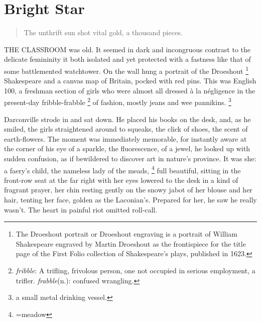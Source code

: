 \chapter{Bright Star}
 
\begin{quotation}
  The unthrift 
sun shot vital gold, a thousand pieces.
\end{quotation}
\vspace{0.2cm}
 
  THE CLASSROOM was old. It seemed in dark and incongruous 
contrast to the
delicate femininity it both isolated and yet protected with a fastness like that
of some battlemented watchtower. On the wall hung a portrait of the Droeshout
\footnote{ The Droeshout portrait or Droeshout engraving is a portrait of
William Shakespeare engraved by Martin Droeshout as the frontispiece for the
title page of the First Folio collection of Shakespeare's plays, published in
1623.
}
Shakespeare and a canvas map of Britain, pocked 
with red pins. This was English
100, a freshman section of girls who were almost all dressed à la négligence in
the present-day fribble-frabble 
\footnote{ \textit{fribble}: A trifling, frivolous person, one not occupied in
serious employment, a trifler. \textit{frabble}(n.): confused wrangling.
}
of fashion, mostly jeans and wee 
pannikins.
\footnote{ \textdbend a small metal drinking vessel.}

  Darconville strode 
in and sat down. He placed his books on the desk, and, as
he smiled, the girls straightened around to squeaks, the click of shoes, the
scent of earth-flowers. The moment was immediately memorable, for instantly
aware at the corner of his eye of a sparkle, the fluorescence, of a jewel, he
looked up with sudden confusion, as if bewildered to discover art in nature's
province. It was she: a faery's child, the nameless lady of the meads, 
\footnote{  =meadow}
full beautiful, sitting in the front-row seat at the far right with her eyes 
lowered to the desk in a kind of fragrant prayer, her chin resting gently on 
the snowy jabot 
of her blouse and her hair, tenting her face, golden as the Laconian's.
Prepared for her, he saw he really wasn't. The heart in painful riot omitted
roll-call.

